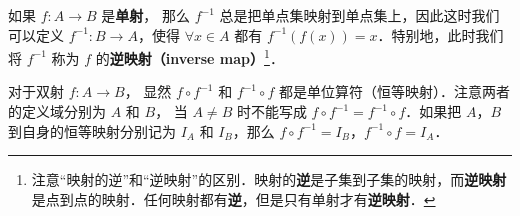 如果 $f:A\to B$ 是\textbf{单射}， 那么 $f^{-1}$ 总是把单点集映射到单点集上，因此这时我们可以定义 $f^{-1}:B\to A$，使得 $\forall x\in A$ 都有 $f^{-1}(f(x))=x$．特别地，此时我们将 $f^{-1}$ 称为 $f$ 的\textbf{逆映射（inverse map）}\footnote{注意“映射的逆”和“逆映射”的区别．映射的\textbf{逆}是子集到子集的映射，而\textbf{逆映射}是点到点的映射．任何映射都有\textbf{逆}，但是只有单射才有\textbf{逆映射}．}．

对于双射 $f:A\to B$， 显然 $f\circ f^{-1}$ 和 $f^{-1}\circ f$ 都是单位算符（恒等映射）．注意两者的定义域分别为 $A$ 和 $B$， 当 $A \ne B$ 时不能写成 $f\circ f^{-1} = f^{-1}\circ f$．如果把 $A$，$B$ 到自身的恒等映射分别记为 $I_A$ 和 $I_B$，那么 $f\circ f^{-1}=I_B$，$f^{-1}\circ f=I_A$．
